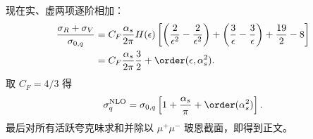 \begin{derivation}
现在实、虚两项逐阶相加：
\begin{align*}
 \frac{\sigma_R+\sigma_V}{\sigma_{0,q}}
 &=C_F\frac{\alpha_s}{2\pi}H(\epsilon)
 \left[
 \left(\frac2{\epsilon^2}-\frac2{\epsilon^2}\right)
 +\left(\frac3\epsilon-\frac3\epsilon\right)
 +\frac{19}{2}-8\right]\\
 &=C_F\frac{\alpha_s}{2\pi}\frac32+\order(\epsilon,\alpha_s^2).
\end{align*}
取 $C_F=4/3$ 得
\begin{equation*}
 \sigma_q^{\rm NLO}
 =\sigma_{0,q}\left[1+\frac{\alpha_s}{\pi}+\order(\alpha_s^2)\right].
\end{equation*}
最后对所有活跃夸克味求和并除以 $\mu^+\mu^-$ 玻恩截面，即得到正文。
\end{derivation}
